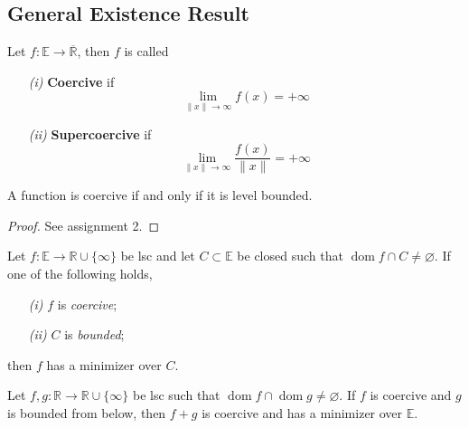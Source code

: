 \documentclass{tufte-handout}
\DeclareMathOperator{\dom}{dom}
\begin{document}
{  \subsection{General Existence Result}%
    \label{sub:General Existence Result}
    \begin{definition}
      Let $f: \mathbb{E} \to \overline {\mathbb{R}}$, then $f$ is called 
      \begin{enumerate}
        \item[\it (i)] \textbf{Coercive} if $$\lim_{\|x\| \to \infty} f(x) = + \infty $$
        \item[\it (ii)] \textbf{Supercoercive} if $$\lim_{\| x\| \to \infty} \frac{f(x)}{\|x\|} = + \infty $$ 
      \end{enumerate}
    \end{definition}
    \begin{proposition}  
      A function is coercive if and only if it is level bounded. 
      \begin{proof} 
        See assignment 2.
      \end{proof}
    \end{proposition}
    \begin{proposition} \label{label}
      Let $f: \mathbb{E} \to \mathbb{R}\cup \{\infty\}$ be lsc and let $C\subset \mathbb{E}$ be closed such that $\dom f \cap C \neq \varnothing$. If one of the following holds,
      \begin{enumerate}
        \item[\it (i)] $f$ is \textit{coercive}; 
        \item[\it (ii)] $C$ is \textit{bounded}; 
      \end{enumerate}
      then $f$ has a minimizer over $C$. 
    \end{proposition}
    \begin{corollary}
      Let $f, g: \mathbb{R} \to \mathbb{R} \cup \{\infty\}$ be lsc such that $\dom f \cap \dom g \neq \varnothing$. If $f$ is coercive and $g$ is bounded from below, then $f+g$ is coercive and has a minimizer over $\mathbb{E}$.  
      
    \end{corollary}
}
\end{document}
